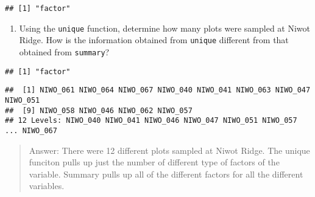 \documentclass[]{article}
\newenvironment{Shaded}{\begin{snugshade}}{\end{snugshade}}
\newcommand{\DataTypeTok}[1]{\textcolor[rgb]{0.13,0.29,0.53}{#1}}
\newcommand{\KeywordTok}[1]{\textcolor[rgb]{0.13,0.29,0.53}{\textbf{#1}}}
\newcommand{\NormalTok}[1]{#1}
\newcommand{\OperatorTok}[1]{\textcolor[rgb]{0.81,0.36,0.00}{\textbf{#1}}}
\newcommand{\StringTok}[1]{\textcolor[rgb]{0.31,0.60,0.02}{#1}}
\providecommand{\tightlist}{%
  \setlength{\itemsep}{0pt}\setlength{\parskip}{0pt}}
\begin{document}
\begin{verbatim}
## [1] "factor"
\end{verbatim}

\begin{Shaded}
\end{Shaded}

\begin{enumerate}
\def\labelenumi{\arabic{enumi}.}
\setcounter{enumi}{12}
\tightlist
\item
  Using the \texttt{unique} function, determine how many plots were
  sampled at Niwot Ridge. How is the information obtained from
  \texttt{unique} different from that obtained from \texttt{summary}?
\end{enumerate}

\begin{Shaded}
\end{Shaded}

\begin{verbatim}
## [1] "factor"
\end{verbatim}

\begin{Shaded}
\end{Shaded}

\begin{verbatim}
##  [1] NIWO_061 NIWO_064 NIWO_067 NIWO_040 NIWO_041 NIWO_063 NIWO_047 NIWO_051
##  [9] NIWO_058 NIWO_046 NIWO_062 NIWO_057
## 12 Levels: NIWO_040 NIWO_041 NIWO_046 NIWO_047 NIWO_051 NIWO_057 ... NIWO_067
\end{verbatim}

\begin{quote}
Answer: There were 12 different plots sampled at Niwot Ridge. The unique
funciton pulls up just the number of different type of factors of the
variable. Summary pulls up all of the different factors for all the
different variables.
\end{quote}
\end{document}

